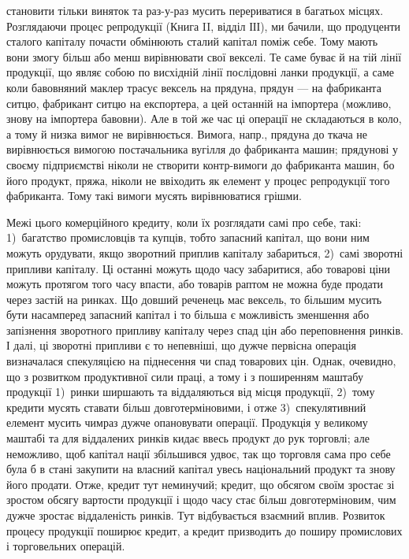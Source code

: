 \parcont{}  %
становити тільки виняток та раз-у-раз мусить перериватися в багатьох
місцях. Розглядаючи процес репродукції (Книга II, відділ ІІІ), ми бачили,
що продуценти сталого капіталу почасти обмінюють сталий капітал поміж
себе. Тому мають вони змогу більш або менш вирівнювати свої векселі. Те саме
буває й на тій лінії продукції, що являє собою по висхідній лінії послідовні ланки
продукції, а саме коли бавовняний маклер трасує вексель на прядуна, прядун —
на фабриканта ситцю, фабрикант ситцю на експортера, а цей останній на імпортера
(можливо, знову на імпортера бавовни). Але в той же час ці операції не складаються
в коло, а тому й низка вимог не вирівнюється. Вимога, напр., прядуна
до ткача не вирівнюється вимогою постачальника вугілля до фабриканта машин;
прядунові у своєму підприємстві ніколи не створити контр-вимоги до фабриканта
машин, бо його продукт, пряжа, ніколи не ввіходить як елемент у процес репродукції
того фабриканта. Тому такі вимоги мусять вирівнюватися грішми.

Межі цього комерційного кредиту, коли їх розглядати самі про себе,
такі: 1)~багатство промисловців та купців, тобто запасний капітал, що вони ним
можуть орудувати, якщо зворотний приплив капіталу забариться, 2)~самі зворотні
припливи капіталу. Ці останні можуть щодо часу забаритися, або товарові ціни
можуть протягом того часу впасти, або товарів раптом не можна буде продати
через застій на ринках. Що довший реченець має вексель, то більшим мусить
бути насамперед запасний капітал і то більша є можливість зменшення або
запізнення зворотного припливу капіталу через спад цін або переповнення ринків.
І далі, ці зворотні припливи є то непевніші, що дужче первісна операція визначалася
спекуляцією на піднесення чи спад товарових цін. Однак, очевидно, що
з розвитком продуктивної сили праці, а тому і з поширенням маштабу продукції
1)~ринки ширшають та віддаляються від місця продукції, 2)~тому кредити мусять
ставати більш довготерміновими, і отже 3)~спекулятивний елемент мусить чимраз
дужче опановувати операції. Продукція у великому маштабі та для віддалених ринків
кидає ввесь продукт до рук торговлі; але неможливо, щоб капітал нації збільшився
удвоє, так що торговля сама про себе була б в стані закупити на власний
капітал увесь національний продукт та знову його продати. Отже, кредит
тут неминучий; кредит, що обсягом своїм зростає зі зростом обсягу вартости
продукції і щодо часу стає більш довготерміновим, чим дужче зростає віддаленість
ринків. Тут відбувається взаємний вплив. Розвиток процесу продукції
поширює кредит, а кредит призводить до поширу промислових і торговельних
операцій.

